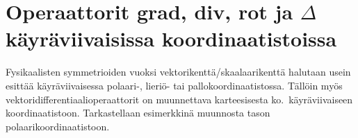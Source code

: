 \section{Operaattorit grad, div, rot ja $\Delta$ \\
         käyräviivaisissa koordinaatistoissa}
\label{div ja rot käyräviivaisissa}
\alku
{}

Fysikaalisten symmetrioiden vuoksi vektorikenttä/skaalaarikenttä halutaan usein esittää 
käyräviivaisessa  polaari-, lieriö- tai pallokoordinaatistossa. Tällöin myös
vektoridifferentiaalioperaattorit on muunnettava karteesisesta ko.\ käyräviivaiseen 
koordinaatistoon. Tarkastellaan esimerkkinä muunnosta tason polaarikoordinaatistoon.

